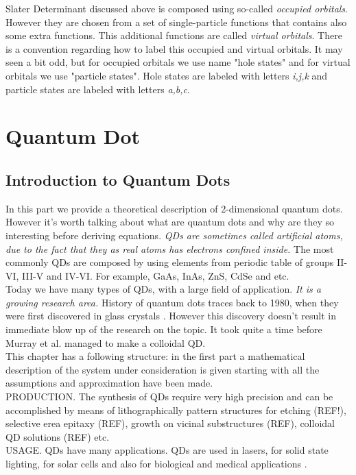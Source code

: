 \documentclass[twoside,english]{uiofysmaster}
\theoremstyle{definition}
\begin{document}
Slater Determinant discussed above is composed using so-called \textit{occupied orbitals}. However they are chosen from a set of single-particle functions that contains also some extra functions. This additional functions are called \textit{virtual orbitals}. There is a convention regarding how to label this occupied and virtual orbitals. It may seen a bit odd, but for occupied orbitals we use name "hole states" and for virtual orbitals we use "particle states". Hole states are labeled with letters \textit{i,j,k} and particle states are labeled with letters \textit{a,b,c}.\\


\chapter{Quantum Dot}

\section{Introduction to Quantum Dots}
In this part we provide a theoretical description of 2-dimensional quantum dots. However it's worth talking about what are quantum dots and why are they so interesting before deriving equations. \textit{QDs are sometimes called artificial atoms, due to the fact that they as real atoms has electrons confined inside.} The most commonly QDs are composed by using elements from periodic table of groups II-VI, III-V and IV-VI. For example, GaAs, InAs, ZnS, CdSe and etc.\\
Today we have many types of QDs, with a large field of application. \textit{It is a growing research area.} History of quantum dots traces back to 1980, when they were first discovered in glass crystals \cite{ekimovaiQuantumSizeEffect1981}. However this discovery doesn't result in immediate blow up of the research on the topic. It took quite a time before Murray et al. \cite{murraySynthesisCharacterizationNearly1993} managed to make a colloidal QD. \\
This chapter has a following structure: in the first part a mathematical description of the system under consideration is given starting with all the assumptions and approximation have been made.\\
PRODUCTION. The synthesis of QDs require very high precision and can be accomplished by means of lithographically pattern structures for etching (REF!), selective erea epitaxy (REF), growth on vicinal substructures (REF), colloidal QD solutions (REF) etc.\\  
USAGE. QDs have many applications. QDs are used in lasers, for solid state lighting, for solar cells and also for biological and medical applications \cite{zhuQuantumDots2013}. 
\end{document}
